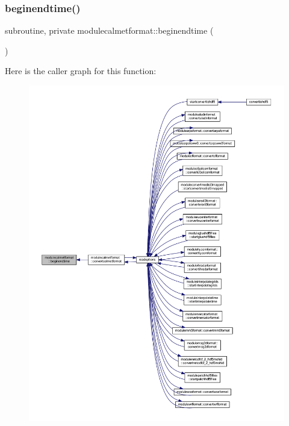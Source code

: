 \subsubsection{\texorpdfstring{beginendtime()}{beginendtime()}}
{\footnotesize\ttfamily subroutine, private modulecalmetformat\+::beginendtime (\begin{DoxyParamCaption}{ }\end{DoxyParamCaption})\hspace{0.3cm}{\ttfamily [private]}}

Here is the caller graph for this function\+:\nopagebreak
\begin{figure}[H]
\begin{center}
\leavevmode
\includegraphics[width=350pt]{namespacemodulecalmetformat_a62bd4a5f15fb34c0505c736e02ac62ca_icgraph}
\end{center}
\end{figure}
\mbox{\label{namespacemodulecalmetformat_abd990931d70766e3d45c4c5e94a1924f}} 

